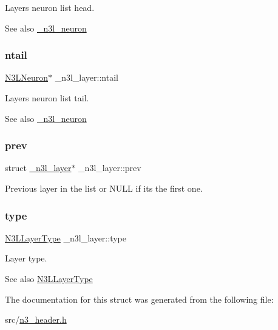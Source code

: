 Layer\textquotesingle{}s neuron list head. \begin{DoxySeeAlso}{See also}
\hyperlink{struct__n3l__neuron}{\+\_\+n3l\+\_\+neuron} 
\end{DoxySeeAlso}
\mbox{\label{struct__n3l__layer_aa120fe4ab0898e733b8d6940b467ebc3}} 
\subsubsection{\texorpdfstring{ntail}{ntail}}
{\footnotesize\ttfamily \hyperlink{n3__header_8h_a621b1df037f351bd3542298933e5799a}{N3\+L\+Neuron}$\ast$ \+\_\+n3l\+\_\+layer\+::ntail}

Layer\textquotesingle{}s neuron list tail. \begin{DoxySeeAlso}{See also}
\hyperlink{struct__n3l__neuron}{\+\_\+n3l\+\_\+neuron} 
\end{DoxySeeAlso}
\mbox{\label{struct__n3l__layer_aedfd507c2c60e3b64234b8cd8570e6c9}} 
\subsubsection{\texorpdfstring{prev}{prev}}
{\footnotesize\ttfamily struct \hyperlink{struct__n3l__layer}{\+\_\+n3l\+\_\+layer}$\ast$ \+\_\+n3l\+\_\+layer\+::prev}

Previous layer in the list or N\+U\+LL if it\textquotesingle{}s the first one. \mbox{\label{struct__n3l__layer_aec180f7f12ea86bb622c364076dbf1f6}} 
\subsubsection{\texorpdfstring{type}{type}}
{\footnotesize\ttfamily \hyperlink{n3__header_8h_a1040baea07fec4d26d25641f75e892c5}{N3\+L\+Layer\+Type} \+\_\+n3l\+\_\+layer\+::type}

Layer type. \begin{DoxySeeAlso}{See also}
\hyperlink{n3__header_8h_a1040baea07fec4d26d25641f75e892c5}{N3\+L\+Layer\+Type} 
\end{DoxySeeAlso}


The documentation for this struct was generated from the following file\+:\begin{DoxyCompactItemize}
\item 
src/\hyperlink{n3__header_8h}{n3\+\_\+header.\+h}\end{DoxyCompactItemize}
